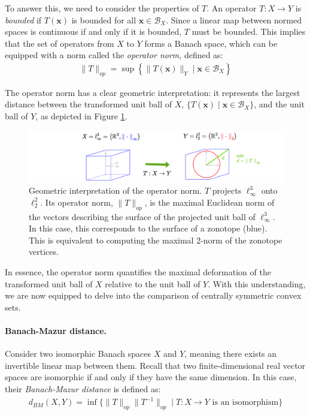 To answer this, we need to consider the properties of $T$. An operator $T: X \rightarrow Y$ is \emph{bounded} if $T(\mathbf{x})$ is bounded for all $\mathbf{x} \in \mathcal{B}_X$.  Since a linear map between normed spaces is continuous if and only if it is bounded, $T$ must be bounded. This implies that the set of operators from $X$ to $Y$ forms a Banach space, which can be equipped with a norm called the \emph{operator norm}, defined as:
\begin{align*}
\|T\|_{op} = \sup\left\{\|T(\mathbf{x})\|_Y \mid \mathbf{x}\in \mathcal{B}_X \right\}
\end{align*}

The operator norm has a clear geometric interpretation: it represents the largest distance between the transformed unit ball of $X$,  $\{T(\mathbf{x}) \mid \mathbf{x}\in \mathcal{B}_X\}$, and the unit ball of $Y$, as depicted in Figure \ref{fig:operator_norm}.
\begin{figure}[!htb]
  \captionsetup{justification=centering}
    \centering
    \includegraphics[trim={150 0 70 0},clip, width=1\linewidth]{img/chapter_3/operator_norm.pdf}
  \caption{Geometric interpretation of the operator norm. $T$ projects $\ell_{\infty}^3$ onto $\ell_2^2$. Its operator norm, $\|T\|_{op}$, is the maximal Euclidean norm of the vectors describing the surface of the projected unit ball of $\ell_{\infty}^3$. In this case, this corresponds to the surface of a zonotope (blue). This is equivalent to computing the maximal 2-norm of the zonotope vertices.}
  \label{fig:operator_norm}
\end{figure}

In essence, the operator norm quantifies the maximal deformation of the transformed unit ball of $X$ relative to the unit ball of $Y$. With this understanding, we are now equipped to delve into the comparison of centrally symmetric convex sets.

\paragraph*{Banach-Mazur distance.} Consider two isomorphic Banach spaces $X$ and $Y$, meaning there exists an invertible linear map between them. Recall that two finite-dimensional real vector spaces are isomorphic if and only if they have the same dimension. In this case, their \emph{Banach-Mazur distance} is defined as:
\begin{align*}
d_{BM}(X,Y) = \inf\{\|T\|_{op} \|T^{-1}\|_{op} \mid T: X\rightarrow Y \text{ is an isomorphism}\}
\end{align*}

